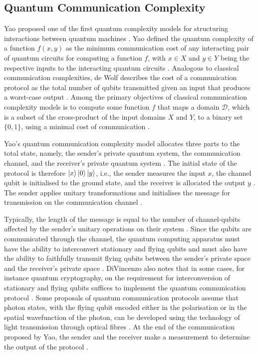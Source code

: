 \subsection{Quantum Communication Complexity}

Yao proposed one of the first quantum complexity models for structuring interactions between quantum machines \cite{yao1993quantum}. Yao defined the quantum complexity of a function $f(x,y)$ as the minimum communication cost of any interacting pair of quantum circuits for computing a function $f$, with $x \in X$ and $y \in Y$ being the respective inputs to the interacting quantum circuits \cite{yao1993quantum}. Analogous to classical communication complexities, de Wolf describes the cost of a communication protocol as the total number of qubits transmitted given an input that produces a worst-case output \cite{DeWolf2019}. Among the primary objectives of classical communication complexity models is to compute some function $f$ that maps a domain $\mathcal{D}$, which is a subset of the cross-product of the input domains $X$ and $Y$, to a binary set $\{0,1\}$, using a minimal cost of communication \cite{DeWolf2019}. 

Yao's quantum communication complexity model allocates three parts to the total state, namely, the sender's private quantum system, the communication channel, and the receiver's private quantum system \cite{DeWolf2019, yao1993quantum}. The initial state of the protocol is therefore $\ket{x}\ket{0}\ket{y}$, i.e., the sender measures the input $x$, the channel qubit is initialised to the ground state, and the receiver is allocated the output $y$ \cite{DeWolf2019}. The sender applies unitary transformations and initialises the message for transmission on the communication channel \cite{DeWolf2019}. 

Typically, the length of the message is equal to the number of channel-qubits affected by the sender's unitary operations on their system \cite{DeWolf2019}. Since the qubits are communicated through the channel, the quantum computing apparatus must have the ability to interconvert stationary and flying qubits and must also have the ability to faithfully transmit flying qubits between the sender's private space and the receiver's private space \cite{divincenzo2000physical}. DiVincenzo also notes that in some cases, for instance quantum cryptography, on the requirement for interconversion of stationary and flying qubits suffices to implement the quantum communication protocol \cite{divincenzo2000physical}. Some proposals of quantum communication protocols assume that photon states, with the flying qubit encoded either in the polarisation or in the spatial wavefunction of the photon, can be developed using the technology of light transmission through optical fibres \cite{divincenzo2000physical}. At the end of the communication proposed by Yao, the sender and the receiver make a measurement to determine the output of the protocol \cite{DeWolf2019}. 

